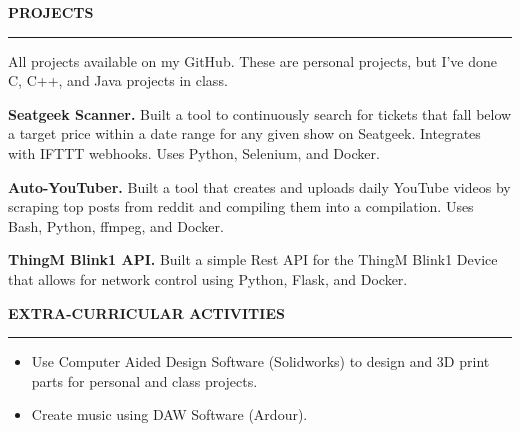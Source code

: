 \documentclass[11pt,letterpaper]{article}
\begin{document}

\medskip
\MakeUppercase{{\bf Projects}} %
\medskip
\hrule %
\begin{list}{}{\setlength{\leftmargin}{0em}}
\item %
\vspace{-1.25em}
\item {All projects available on my GitHub. These are personal projects, but I've done C, C++, and Java projects in class. }
\item \textbf{Seatgeek Scanner.} {Built a tool to continuously search for tickets that fall below a target price within a date range for any given show on Seatgeek. Integrates with IFTTT webhooks. Uses Python, Selenium, and Docker. }
\item \textbf{Auto-YouTuber.} {Built a tool that creates and uploads daily YouTube videos by scraping top posts from reddit and compiling them into a compilation. Uses Bash, Python, ffmpeg, and Docker. }
\item \textbf{ThingM Blink1 API.} {Built a simple Rest API for the ThingM Blink1 Device that allows for network control using Python, Flask, and Docker.}
\end{list}


\medskip
\MakeUppercase{{\bf Extra-Curricular Activities}} %
\medskip
\hrule %
\begin{list}{}{\setlength{\leftmargin}{0em}}
\item
\begin{itemize}
    \item Use Computer Aided Design Software (Solidworks) to design and 3D print parts for personal and class projects. %
    \item Create music using DAW Software (Ardour).
\end{itemize}
\end{list}
\end{document}
